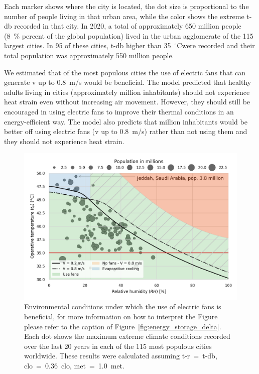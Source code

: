 Each marker shows where the city is located, the dot size is proportional to the number of people living in that urban area, while the color shows the extreme \ac{t-db} recorded in that city.
In 2020, a total of approximately 650 million people (8~\% percent of the global population) lived in the urban agglomerate of the 115 largest cities.
In 95 of these cities, \ac{t-db} higher than 35~$^{\circ}$C\@ were recorded and their total population was approximately 550 million people.

We estimated that  of the most populous cities the use of electric fans that can generate \ac{v} up to 0.8~m/s would be beneficial.
The  model predicted that healthy adults living in  cities (approximately  million inhabitants) should not experience heat strain even without increasing air movement. 
However, they should still be encouraged in using electric fans to improve their thermal conditions in an energy-efficient way.
The model also predicts that  million inhabitants would be better off using electric fans (\ac{v} up to 0.8~m/s) rather than not using them and they should not experience heat strain.

\begin{figure}[thb!]
    \centering
    \includegraphics[width=\textwidth]{figures/use_fans_and_population}
    \caption{Environmental conditions under which the use of electric fans is beneficial, for more information on how to interpret the Figure please refer to the caption of Figure~\ref{fig:energy_storage_delta}.
    Each dot shows the maximum extreme climate conditions recorded over the last 20 years in each of the 115 most populous cities worldwide.
    These results were calculated assuming \ac{t-r}~=~\ac{t-db}, \ac{clo}~=~0.36~clo, \ac{met}~=~1.0~met.}
    \label{fig:use_fans_and_population}
\end{figure}

